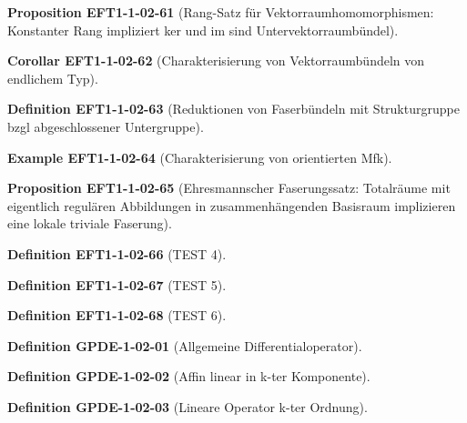 \documentclass[10pt, letterpaper]{article}
\newcommand{\CustomHeading}[3]{%
  \par\medskip\noindent%
  \textbf{#1 #2} \textnormal{(#3)}.\enskip%
}
\newenvironment{DEF}[2]{\CustomHeading{Definition}{#1}{#2}}{}
\newenvironment{PROP}[2]{\CustomHeading{Proposition}{#1}{#2}}{}
\newenvironment{KORO}[2]{\CustomHeading{Corollar}{#1}{#2}}{}
\newenvironment{EXA}[2]{\CustomHeading{Example}{#1}{#2}}{}
\begin{document}
\begin{PROP}{EFT1-1-02-61}{Rang-Satz für Vektorraumhomomorphismen: Konstanter Rang impliziert ker und im sind Untervektorraumbündel}
\end{PROP}

\begin{KORO}{EFT1-1-02-62}{Charakterisierung von Vektorraumbündeln von endlichem Typ}
\end{KORO}

\begin{DEF}{EFT1-1-02-63}{Reduktionen von Faserbündeln mit Strukturgruppe bzgl abgeschlossener Untergruppe}
\end{DEF}

\begin{EXA}{EFT1-1-02-64}{Charakterisierung von orientierten Mfk}
\end{EXA}

\begin{PROP}{EFT1-1-02-65}{Ehresmannscher Faserungssatz: Totalräume mit eigentlich regulären Abbildungen in zusammenhängenden Basisraum implizieren eine lokale triviale Faserung}
\end{PROP}

\begin{DEF}{EFT1-1-02-66}{TEST 4}
\end{DEF}

\begin{DEF}{EFT1-1-02-67}{TEST 5}
\end{DEF}

\begin{DEF}{EFT1-1-02-68}{TEST 6}
\end{DEF}

\begin{DEF}{GPDE-1-02-01}{Allgemeine Differentialoperator}
\end{DEF}

\begin{DEF}{GPDE-1-02-02}{Affin linear in k-ter Komponente}
\end{DEF}

\begin{DEF}{GPDE-1-02-03}{Lineare Operator k-ter Ordnung}
\end{DEF}
\end{document}
